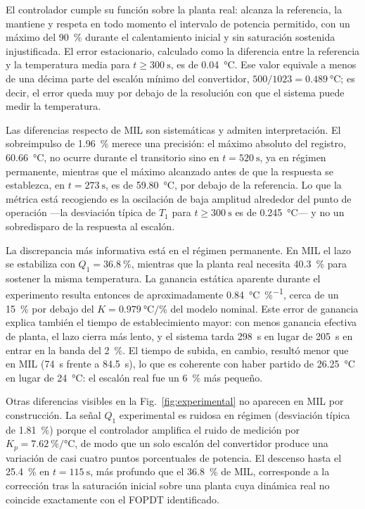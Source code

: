 \documentclass[conference,a4paper,10pt]{IEEEtran}
\newcommand{\Kp}{K_p}
\begin{document}
El controlador cumple su función sobre la planta real: alcanza la referencia, la mantiene y respeta
en todo momento el intervalo de potencia permitido, con un máximo del \SI{90}{\percent} durante el
calentamiento inicial y sin saturación sostenida injustificada. El error estacionario, calculado como la diferencia entre la
referencia y la temperatura media para $t \geq \SI{300}{\second}$, es de \SI{0.04}{\celsius}.
Ese valor equivale a menos de una décima parte del escalón mínimo del convertidor,
$500/1023 = \SI{0.489}{\celsius}$; es decir, el error queda muy por debajo de la resolución con que
el sistema puede medir la temperatura.

Las diferencias respecto de MIL son sistemáticas y admiten interpretación. El sobreimpulso de
\SI{1.96}{\percent} merece una precisión: el máximo absoluto del registro,
\SI{60.66}{\celsius}, no ocurre durante el transitorio sino en $t = \SI{520}{\second}$, ya en
régimen permanente, mientras que el máximo alcanzado antes de que la respuesta se
establezca, en $t = \SI{273}{\second}$, es de \SI{59.80}{\celsius}, por debajo de la referencia. Lo que la métrica está recogiendo es la
oscilación de baja amplitud alrededor del punto de operación ---la desviación típica de $T_1$ para
$t \geq \SI{300}{\second}$ es de \SI{0.245}{\celsius}--- y no un sobredisparo de la respuesta al
escalón.

La discrepancia más informativa está en el régimen permanente. En MIL el lazo se estabiliza con
$Q_1 = \SI{36.8}{\percent}$, mientras que la planta real necesita \SI{40.3}{\percent} para sostener
la misma temperatura. La ganancia estática aparente durante el experimento resulta entonces de
aproximadamente \SI{0.84}{\celsius\per\percent}, cerca de un \SI{15}{\percent} por debajo del
$K = \SI{0.979}{\celsius\per\percent}$ del modelo nominal. Este error de ganancia explica también el
tiempo de establecimiento mayor: con menos ganancia efectiva de planta, el lazo cierra más lento,
y el sistema tarda \SI{298}{\second} en lugar de \SI{205}{\second} en entrar en la banda del
\SI{2}{\percent}. El tiempo de subida, en cambio, resultó menor que en MIL (\SI{74}{\second} frente
a \SI{84.5}{\second}), lo que es coherente con haber partido de \SI{26.25}{\celsius} en lugar de
\SI{24}{\celsius}: el escalón real fue un \SI{6}{\percent} más pequeño.

Otras diferencias visibles en la Fig.~\ref{fig:experimental} no aparecen en MIL por construcción.
La señal $Q_1$ experimental es ruidosa en régimen (desviación típica de \SI{1.81}{\percent}) porque
el controlador amplifica el ruido de medición por $\Kp = \SI{7.62}{\percent\per\celsius}$, de modo
que un solo escalón del convertidor produce una variación de casi cuatro puntos porcentuales de
potencia. El descenso hasta el \SI{25.4}{\percent} en $t = \SI{115}{\second}$, más
profundo que el \SI{36.8}{\percent} de MIL, corresponde a la corrección tras la saturación inicial
sobre una planta cuya dinámica real no coincide exactamente con el FOPDT identificado.
\end{document}
